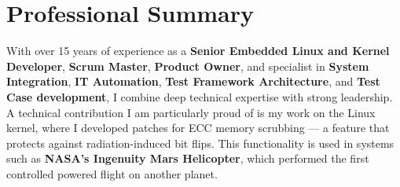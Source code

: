 \documentclass[10pt,a4paper,sans]{moderncv}
\begin{document}
\makecvtitle

\section{Professional Summary}
With over 15 years of experience as a \textbf{Senior Embedded Linux and Kernel
Developer}, \textbf{Scrum Master}, \textbf{Product Owner}, and specialist in
\textbf{System Integration}, \textbf{IT Automation}, \textbf{Test Framework
Architecture}, and \textbf{Test Case development}, I combine deep technical
expertise with strong leadership.
\newline
\newline
A technical contribution I am particularly proud of is my work on the Linux
kernel, where I developed patches for ECC memory scrubbing — a feature that
protects against radiation-induced bit flips. This functionality is used in
systems such as \textbf{NASA’s Ingenuity Mars Helicopter}, which performed the
first controlled powered flight on another planet.

\end{document}
